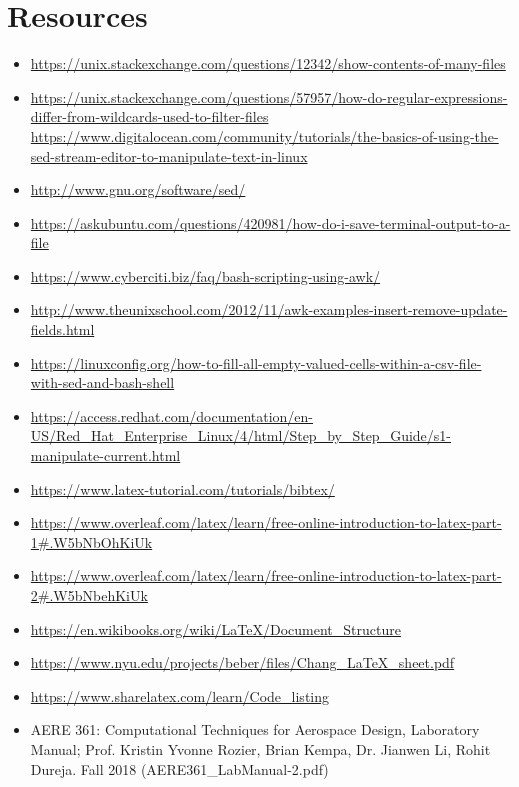 \documentclass{article}
\begin{document}
\section{Resources}
\begin{itemize}
\item
\url{https://unix.stackexchange.com/questions/12342/show-contents-of-many-files}
\item
\url{https://unix.stackexchange.com/questions/57957/how-do-regular-expressions-differ-from-wildcards-used-to-filter-files}
\url{https://www.digitalocean.com/community/tutorials/the-basics-of-using-the-sed-stream-editor-to-manipulate-text-in-linux}
\item
\url{http://www.gnu.org/software/sed/}
\item
\url{https://askubuntu.com/questions/420981/how-do-i-save-terminal-output-to-a-file}
\item
\url{https://www.cyberciti.biz/faq/bash-scripting-using-awk/}
\item
\url{http://www.theunixschool.com/2012/11/awk-examples-insert-remove-update-fields.html}
\item
\url{https://linuxconfig.org/how-to-fill-all-empty-valued-cells-within-a-csv-file-with-sed-and-bash-shell}
\item
\url{https://access.redhat.com/documentation/en-US/Red_Hat_Enterprise_Linux/4/html/Step_by_Step_Guide/s1-manipulate-current.html}
\item
\url{https://www.latex-tutorial.com/tutorials/bibtex/}
\item
\url{https://www.overleaf.com/latex/learn/free-online-introduction-to-latex-part-1#.W5bNbOhKiUk}
\item
\url{https://www.overleaf.com/latex/learn/free-online-introduction-to-latex-part-2#.W5bNbehKiUk}
\item
\url{https://en.wikibooks.org/wiki/LaTeX/Document_Structure}
\item
\url{https://www.nyu.edu/projects/beber/files/Chang_LaTeX_sheet.pdf}
\item
\url{https://www.sharelatex.com/learn/Code_listing}
\item
AERE 361: Computational Techniques for Aerospace Design, Laboratory Manual; Prof. Kristin Yvonne Rozier, Brian Kempa, Dr. Jianwen Li, Rohit Dureja. Fall 2018 (AERE361\_LabManual-2.pdf)
\end{itemize}
\end{document}

